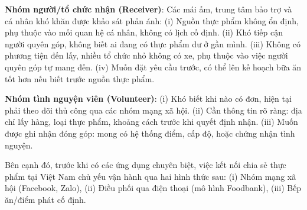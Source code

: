 \documentclass[../main.tex]{subfiles}%
\begin{document}
\textbf{Nhóm người/tổ chức nhận (Receiver)}: Các mái ấm, trung tâm bảo trợ và cá nhân khó khăn được khảo sát phản ánh: (i) Nguồn thực phẩm không ổn định, phụ thuộc vào mối quan hệ cá nhân, không có lịch cố định. (ii) Khó tiếp cận người quyên góp, không biết ai đang có thực phẩm dư ở gần mình. (iii) Không có phương tiện đến lấy, nhiều tổ chức nhỏ không có xe, phụ thuộc vào việc người quyên góp tự mang đến. (iv) Muốn đặt yêu cầu trước, có thể lên kế hoạch bữa ăn tốt hơn nếu biết trước nguồn thực phẩm.

\textbf{Nhóm tình nguyện viên (Volunteer)}: (i) Khó biết khi nào có đơn, hiện tại phải theo dõi thủ công qua các nhóm mạng xã hội. (ii) Cần thông tin rõ ràng: địa chỉ lấy hàng, loại thực phẩm, khoảng cách trước khi quyết định nhận. (iii) Muốn được ghi nhận đóng góp: mong có hệ thống điểm, cấp độ, hoặc chứng nhận tình nguyện.

Bên cạnh đó, trước khi có các ứng dụng chuyên biệt, việc kết nối chia sẻ thực phẩm tại Việt Nam chủ yếu vận hành qua hai hình thức sau: (i) Nhóm mạng xã hội (Facebook, Zalo), (ii) Điều phối qua điện thoại (mô hình Foodbank), (iii) Bếp ăn/điểm phát cố định.

\begin{table}[H]
\centering
{}
\caption{Đánh giá các hình thức điều phối hiện có tại Việt Nam}
\label{tab:danh_gia_hinh_thuc_dieu_phoi}
\end{table}
\end{document}
